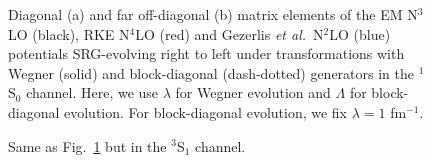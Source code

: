 \documentclass[preprintnumbers,floatfix,aps,prc,preprint,nofootinbib]{revtex4-1}
\begin{document}
%
\begin{figure}[H]
	\centering
	
	\caption{Diagonal (a) and far off-diagonal (b) matrix elements of the EM N$^3$LO (black), RKE N$^4$LO (red) and Gezerlis \textit{et al.}~N$^2$LO (blue) potentials SRG-evolving right to left under transformations with Wegner (solid) and block-diagonal (dash-dotted) generators in the $^1$S$_0$ channel. Here, we use $\lambda$ for Wegner evolution and $\Lambda$ for block-diagonal evolution. For block-diagonal evolution, we fix $\lambda=1$ fm$^{-1}$.}
	\label{fig:potential_slices_1S0}
\end{figure}
%
\begin{figure}[H]
	\centering
	
	\caption{Same as Fig.~\ref{fig:potential_slices_1S0} but in the $^3$S$_1$ channel.}
	\label{fig:potential_slices_3S1}
\end{figure}
\end{document}
